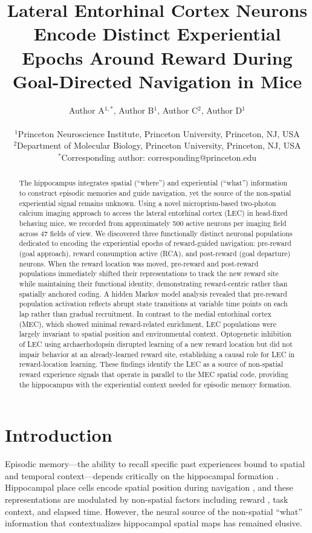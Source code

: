 \documentclass[11pt]{article}
\title{Lateral Entorhinal Cortex Neurons Encode Distinct Experiential Epochs Around Reward During Goal-Directed Navigation in Mice}
\author{
Author A$^{1,*}$, Author B$^{1}$, Author C$^{2}$, Author D$^{1}$ \\
\\
\small $^{1}$Princeton Neuroscience Institute, Princeton University, Princeton, NJ, USA \\
\small $^{2}$Department of Molecular Biology, Princeton University, Princeton, NJ, USA \\
\small $^{*}$Corresponding author: corresponding@princeton.edu
}
\date{}
\begin{document}
\maketitle

\begin{abstract}
The hippocampus integrates spatial (``where'') and experiential (``what'') information to construct episodic memories and guide navigation, yet the source of the non-spatial experiential signal remains unknown. Using a novel microprism-based two-photon calcium imaging approach to access the lateral entorhinal cortex (LEC) in head-fixed behaving mice, we recorded from approximately 500 active neurons per imaging field across 47 fields of view. We discovered three functionally distinct neuronal populations dedicated to encoding the experiential epochs of reward-guided navigation: pre-reward (goal approach), reward consumption active (RCA), and post-reward (goal departure) neurons. When the reward location was moved, pre-reward and post-reward populations immediately shifted their representations to track the new reward site while maintaining their functional identity, demonstrating reward-centric rather than spatially anchored coding. A hidden Markov model analysis revealed that pre-reward population activation reflects abrupt state transitions at variable time points on each lap rather than gradual recruitment. In contrast to the medial entorhinal cortex (MEC), which showed minimal reward-related enrichment, LEC populations were largely invariant to spatial position and environmental context. Optogenetic inhibition of LEC using archaerhodopsin disrupted learning of a new reward location but did not impair behavior at an already-learned reward site, establishing a causal role for LEC in reward-location learning. These findings identify the LEC as a source of non-spatial reward experience signals that operate in parallel to the MEC spatial code, providing the hippocampus with the experiential context needed for episodic memory formation.
\end{abstract}

\section{Introduction}

Episodic memory---the ability to recall specific past experiences bound to spatial and temporal context---depends critically on the hippocampal formation \citep{squire2004, eichenbaum2014}. Hippocampal place cells encode spatial position during navigation \citep{okeefe1971}, and these representations are modulated by non-spatial factors including reward \citep{hollup2001, dupret2010, gauthier2018}, task context, and elapsed time. However, the neural source of the non-spatial ``what'' information that contextualizes hippocampal spatial maps has remained elusive.
\end{document}
